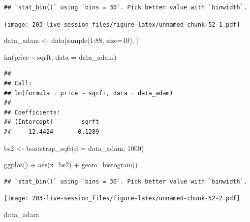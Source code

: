 \documentclass[
]{book}
\newenvironment{Shaded}{\begin{snugshade}}{\end{snugshade}}
\newcommand{\AttributeTok}[1]{\textcolor[rgb]{0.77,0.63,0.00}{#1}}
\newcommand{\DecValTok}[1]{\textcolor[rgb]{0.00,0.00,0.81}{#1}}
\newcommand{\FunctionTok}[1]{\textcolor[rgb]{0.00,0.00,0.00}{#1}}
\newcommand{\NormalTok}[1]{#1}
\newcommand{\OtherTok}[1]{\textcolor[rgb]{0.56,0.35,0.01}{#1}}
\newcommand{\SpecialCharTok}[1]{\textcolor[rgb]{0.00,0.00,0.00}{#1}}
\theoremstyle{definition}
\theoremstyle{definition}
\theoremstyle{definition}
\theoremstyle{definition}
\theoremstyle{remark}
\begin{document}
\begin{verbatim}
## `stat_bin()` using `bins = 30`. Pick better value with `binwidth`.
\end{verbatim}

\texttt{[image: 203-live-session\_files/figure-latex/unnamed-chunk-52-1.pdf]}

\begin{Shaded}
\begin{Highlighting}[]
\NormalTok{data\_adam }\OtherTok{\textless{}{-}}\NormalTok{ data[}\FunctionTok{sample}\NormalTok{(}\DecValTok{1}\SpecialCharTok{:}\DecValTok{88}\NormalTok{, }\AttributeTok{size=}\DecValTok{10}\NormalTok{), ]}

\FunctionTok{lm}\NormalTok{(price }\SpecialCharTok{\textasciitilde{}}\NormalTok{ sqrft, }\AttributeTok{data =}\NormalTok{ data\_adam)}
\end{Highlighting}
\end{Shaded}

\begin{verbatim}
## 
## Call:
## lm(formula = price ~ sqrft, data = data_adam)
## 
## Coefficients:
## (Intercept)        sqrft  
##     12.4424       0.1289
\end{verbatim}

\begin{Shaded}
\begin{Highlighting}[]
\NormalTok{bs2 }\OtherTok{\textless{}{-}} \FunctionTok{bootstrap\_sqft}\NormalTok{(}\AttributeTok{d =}\NormalTok{ data\_adam, }\DecValTok{1000}\NormalTok{)}

\FunctionTok{ggplot}\NormalTok{() }\SpecialCharTok{+} 
  \FunctionTok{aes}\NormalTok{(}\AttributeTok{x=}\NormalTok{bs2) }\SpecialCharTok{+} 
  \FunctionTok{geom\_histogram}\NormalTok{()}
\end{Highlighting}
\end{Shaded}

\begin{verbatim}
## `stat_bin()` using `bins = 30`. Pick better value with `binwidth`.
\end{verbatim}

\texttt{[image: 203-live-session\_files/figure-latex/unnamed-chunk-52-2.pdf]}

\begin{Shaded}
\begin{Highlighting}[]
\NormalTok{data\_adam}
\end{Highlighting}
\end{Shaded}
\end{document}
